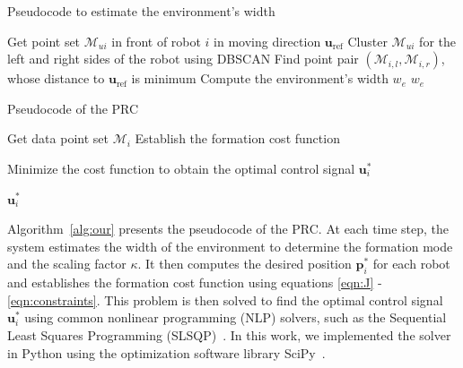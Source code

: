 \begin{algorithm}[h!]
\caption{Pseudocode to estimate the environment's width}
\label{alg:we}
Get point set $\mathcal{M}_{ui}$ in front of robot $i$ in moving direction $\mathbf{u}_\text{ref}$
Cluster $\mathcal{M}_{ui}$ for the left and right sides of the robot using DBSCAN\;
Find point pair $\left(\mathcal{M}_{i,l},\mathcal{M}_{i,r}\right)$, whose distance to $\mathbf{u}_\text{ref}$ is minimum\;
Compute the environment's width $w_e$
\Return $w_e$\;
\end{algorithm}

\begin{algorithm}[h!]
\caption{Pseudocode of the PRC}
\label{alg:our}
Get data point set $\mathcal{M}_i$\;
Establish the formation cost function

Minimize the cost function to obtain the optimal control signal $\mathbf{u}_i^*$

\Return $\mathbf{u}_i^*$\;
\end{algorithm}

Algorithm~\ref{alg:our} presents the pseudocode of the PRC. At each time step, the system estimates the width of the environment to determine the formation mode and the scaling factor $\kappa$. It then computes the desired position $\mathbf{p}_i^*$ for each robot and establishes the formation cost function using equations \eqref{eqn:J} - \eqref{eqn:constraints}. This problem is then solved to find the optimal control signal $\mathbf{u}_i^*$ using common nonlinear programming (NLP)
solvers, such as the Sequential Least Squares Programming (SLSQP)~\cite{kraft1988software}. In this work, we implemented the solver in Python using the optimization software library SciPy~\cite{2020SciPy-NMeth}.
